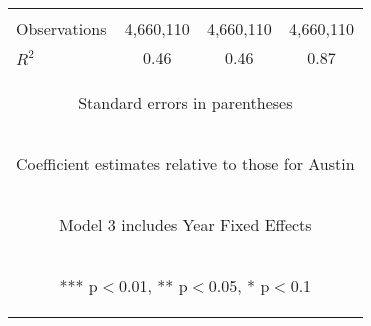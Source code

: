 \begin{center}
\begin{tabular}{lccc}
\vspace{4pt} & \begin{footnotesize}\end{footnotesize} & \begin{footnotesize}\end{footnotesize} & \begin{footnotesize}\end{footnotesize} \\
Observations & 4,660,110 & 4,660,110 & 4,660,110 \\
 $R^2$ & 0.46 & 0.46 & 0.87 \\ \hline
\multicolumn{4}{c}{\begin{footnotesize} Standard errors in parentheses\end{footnotesize}} \\
\multicolumn{4}{c}{\begin{footnotesize} Coefficient estimates relative to those for Austin\end{footnotesize}} \\
\multicolumn{4}{c}{\begin{footnotesize} Model 3 includes Year Fixed Effects\end{footnotesize}} \\
\multicolumn{4}{c}{\begin{footnotesize} *** p$<$0.01, ** p$<$0.05, * p$<$0.1\end{footnotesize}} \\
\end{tabular}
\end{center}
